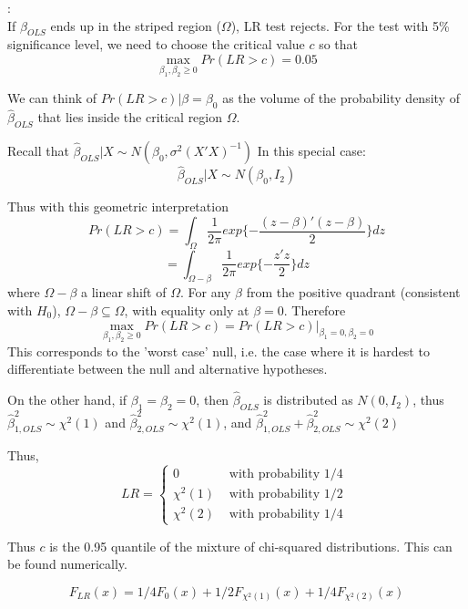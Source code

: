 \documentclass[DIV=14,titlepage=false]{scrreprt}
\begin{document}
\underline{}:
\\ If \(\beta_{OLS}\) ends up in the striped region (\(\Omega\)), LR test rejects. For the test with 5\% significance level, we need to choose the critical value \(c\) so that
\[\operatorname*{max}_{\beta_1,\beta_2\geq0}Pr(LR>c)=0.05\]

We can think of \(Pr(LR>c)|\beta=\beta_0\) as the volume of the probability density of \(\hat\beta_{OLS}\) that lies inside the critical region \(\Omega\).

Recall that \(\hat\beta_{OLS}|X\sim N(\beta_0,\sigma^2(X'X)^{-1})\)
In this special case:
\[\hat\beta_{OLS}|X\sim N(\beta_0,I_2)\]

Thus with this geometric interpretation
\[Pr(LR>c)=\int_{\Omega}\frac{1}{2\pi}exp\{-\frac{(z-\beta)'(z-\beta)}{2}\}dz\]
\[=\int_{\Omega-\beta}\frac{1}{2\pi}exp\{-\frac{z'z}{2}\}dz\]
where \(\Omega-\beta\) a linear shift of \(\Omega\). For any \(\beta\) from the positive quadrant (consistent with \(H_0\)), \(\Omega-\beta\subseteq\Omega\), with equality only at \(\beta=0\).
Therefore
\[\operatorname*{max}_{\beta_1,\beta_2\geq0}Pr(LR>c)=Pr(LR>c)|_{\beta_1=0,\beta_2=0}\]
This corresponds to the 'worst case' null, i.e. the case where it is hardest to differentiate between the null and alternative hypotheses.

On the other hand, if \(\beta_1=\beta_2=0\), then \(\hat\beta_{OLS}\) is distributed as \(N(0,I_2)\), thus \(\hat\beta_{1,OLS}^2\sim\chi^2(1)\) and \(\hat\beta_{2,OLS}^2\sim\chi^2(1)\), and \(\hat\beta_{1,OLS}^2+\hat\beta_{2,OLS}^2\sim\chi^2(2)\)

Thus,
\[LR=\begin{cases}0 & \text{ with probability 1/4 }
    \\ \chi^2(1) & \text{ with probability 1/2 }
    \\ \chi^2(2) & \text{ with probability 1/4 }
\end{cases}\]

Thus \(c\) is the 0.95 quantile of the mixture of chi-squared distributions. This can be found numerically.

\[F_{LR}(x)= 1/4F_0(x)+1/2F_{\chi^2(1)}(x)+1/4F_{\chi^2(2)}(x)\]
\end{document}
